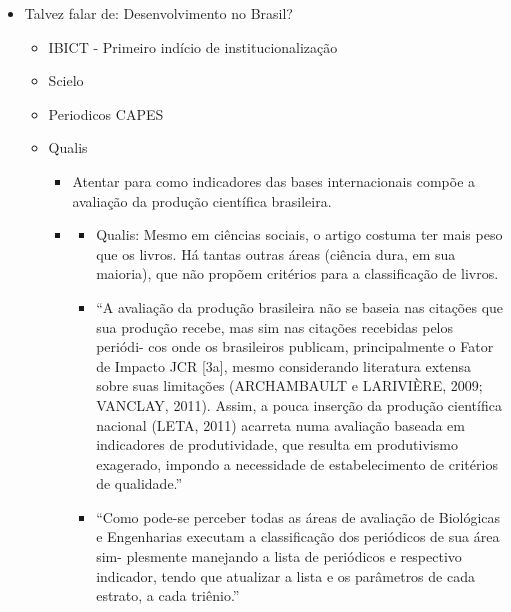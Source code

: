 \documentclass[11pt]{article}
\begin{document}
\begin{itemize}
\item Talvez falar de: Desenvolvimento no Brasil?
\begin{itemize}
\item IBICT - Primeiro indício de institucionalização
\item Scielo
\item Periodicos CAPES
\item Qualis
\begin{itemize}
\item Atentar para como indicadores das bases internacionais compõe a avaliação da produção científica brasileira.
\item \cite{mugnaini2014}
\begin{itemize}
\item Qualis: Mesmo em ciências sociais, o artigo costuma ter mais peso que os livros. Há tantas outras áreas (ciência dura, em sua maioria), que não propõem critérios para a classificação de livros.
\item “A avaliação da produção brasileira não se baseia nas citações que sua produção recebe, mas sim nas citações recebidas pelos periódi- cos onde os brasileiros publicam, principalmente o Fator de Impacto JCR [3a], mesmo considerando literatura extensa sobre suas limitações (ARCHAMBAULT e LARIVIÈRE, 2009; VANCLAY, 2011). Assim, a pouca inserção da produção científica nacional (LETA, 2011) acarreta  numa avaliação baseada em indicadores de produtividade, que resulta em produtivismo exagerado, impondo a necessidade de estabelecimento de critérios de qualidade.”
\item “Como pode-se perceber todas as áreas de avaliação de Biológicas e Engenharias executam a classificação dos periódicos de sua área sim- plesmente manejando a lista de periódicos e respectivo indicador, tendo que atualizar a lista e os parâmetros de cada estrato, a cada triênio.”
\end{itemize}
\end{itemize}
\end{itemize}
\end{itemize}
\end{document}
